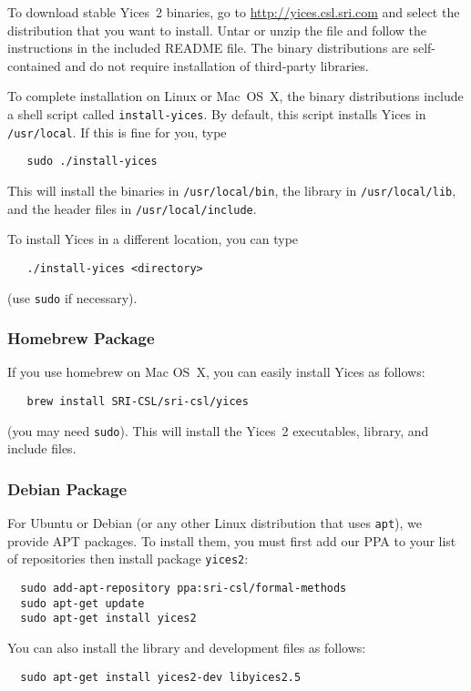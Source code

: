 \documentclass[11pt,twoside,fleqn,openright,titlepage]{cslreport}
\begin{document}
To download stable Yices~2 binaries, go to
\url{http://yices.csl.sri.com} and select the distribution that you
want to install.  Untar or unzip the file and follow the instructions
in the included README file.  The binary distributions are
self-contained and do not require installation of third-party
libraries.

To complete installation on Linux or Mac~OS~X, the binary
distributions include a shell script called \texttt{install-yices}. By
default, this script installs Yices in \texttt{/usr/local}. If
this is fine for you, type
\begin{small}
\begin{verbatim}
   sudo ./install-yices
\end{verbatim}
\end{small}
This will install the binaries in \texttt{/usr/local/bin}, the library
in \texttt{/usr/local/lib}, and the header files in
\texttt{/usr/local/include}.

\medskip\noindent
To install Yices in a different location, you can type
\begin{small}
\begin{verbatim}
   ./install-yices <directory>
\end{verbatim}
\end{small}
(use \texttt{sudo} if necessary).


\subsubsection{Homebrew Package}

If you use homebrew on Mac OS~X, you can easily install Yices as follows:
\begin{small}
\begin{verbatim}
   brew install SRI-CSL/sri-csl/yices
\end{verbatim}
\end{small}
(you may need \texttt{sudo}). This will install the Yices~2
executables, library, and include files.


\subsubsection{Debian Package}

For Ubuntu or Debian (or any other Linux distribution that uses
\texttt{apt}), we provide APT packages. To install them, you must
first add our PPA to your list of repositories then install package
\texttt{yices2}:
\begin{small}
\begin{verbatim}
  sudo add-apt-repository ppa:sri-csl/formal-methods
  sudo apt-get update
  sudo apt-get install yices2
\end{verbatim}
\end{small}
You can also install the library and development files as follows:
\begin{small}
\begin{verbatim}
  sudo apt-get install yices2-dev libyices2.5
\end{verbatim}
\end{small}
\end{document}
